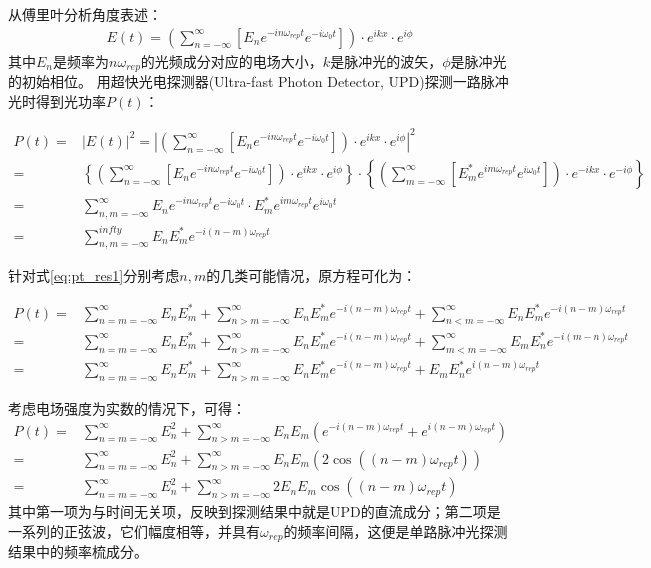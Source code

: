 从傅里叶分析角度表述：
\begin{align}
    E(t)=\left(\sum_{n=-\infty}^{\infty}\left[E_n e^{-in\omega_{rep}t} e^{-i\omega_0 t} \right]\right)\cdot e^{ikx}\cdot e^{i\phi}
\end{align}
其中$E_n$是频率为$n\omega_{rep}$的光频成分对应的电场大小，$k$是脉冲光的波矢，$\phi$是脉冲光的初始相位。
用超快光电探测器(Ultra-fast Photon Detector, UPD)探测一路脉冲光时得到光功率$P(t)$：
\begin{footnotesize}
\begin{align}
    P(t)=&|E(t)|^2=\left|\left(\sum_{n=-\infty}^{\infty}\left[E_n e^{-in\omega_{rep}t} e^{-i\omega_0 t} \right]\right)\cdot e^{ikx}\cdot e^{i\phi}\right|^2\\
    =&\left\{\left(\sum_{n=-\infty}^{\infty}\left[E_n e^{-in\omega_{rep}t} e^{-iω_0 t} \right]\right)\cdot e^{ikx}\cdot e^{i\phi}\right\} \cdot\left\{\left(\sum_{m=-\infty}^{\infty}\left[E^*_m e^{im\omega_{rep}t} e^{i\omega_0 t} \right]\right)\cdot e^{-ikx}\cdot e^{-i\phi}\right\}\\
    =&\sum_{n,m=-\infty}^{\infty}E_n e^{-in\omega_{rep} t} e^{-i\omega_0 t}\cdot E_m^* e^{im\omega_{rep} t} e^{i\omega_0 t}\\
    =&\sum_{n,m=-\infty}^{infty}E_n E_m^* e^{-i(n-m) \omega_{rep} t}\label{eq:pt_res1}
\end{align}    
\end{footnotesize}

针对式\eqref{eq:pt_res1}分别考虑$n,m$的几类可能情况，原方程可化为：
\begin{footnotesize}
\begin{align}
    P(t)=&\sum_{n=m=-\infty}^{\infty}E_n E_m^*
    +\sum_{n>m=-\infty}^{\infty}E_n E_m^*e^{-i(n-m)\omega_{rep}t}+\sum_{n<m=-\infty}^{\infty}E_n E_m^*e^{-i(n-m)\omega_{rep}t}\\
    =&\sum_{n=m=-\infty}^{\infty}E_n E_m^*
    +\sum_{n>m=-\infty}^{\infty}E_n E_m^*e^{-i(n-m)\omega_{rep}t}+\sum_{m<m=-\infty}^{\infty}E_m E_n^*e^{-i(m-n)\omega_{rep}t}\\
    =&\sum_{n=m=-\infty}^{\infty}E_n E_m^*+\sum_{n>m=-\infty}^{\infty}E_n E_m^*e^{-i(n-m)\omega_{rep}t}+E_mE_n^* e^{i(n-m)\omega_{rep}t}
\end{align}
\end{footnotesize}

考虑电场强度为实数的情况下，可得：
\begin{align}
    P(t)=&\sum_{n=m=-\infty}^{\infty}E_n^2 + \sum_{n>m=-\infty}^{\infty}E_n E_m\left(e^{-i(n-m)\omega_{rep}t}+e^{i(n-m)\omega_{rep}t}\right)\\
    =&\sum_{n=m=-\infty}^{\infty}E_n^2 + \sum_{n>m=-\infty}^{\infty}E_n E_m\left(2\cos\left((n-m)\omega_{rep}t\right)\right)\\
    =&\sum_{n=m=-\infty}^{\infty}E_n^2 + \sum_{n>m=-\infty}^{\infty}2E_n E_m \cos\left((n-m)\omega_{rep}t\right)\label{eq:pt_res2}
\end{align}
其中第一项为与时间无关项，反映到探测结果中就是UPD的直流成分；第二项是一系列的正弦波，它们幅度相等，并具有$\omega_{rep}$的频率间隔，这便是单路脉冲光探测结果中的频率梳成分。

